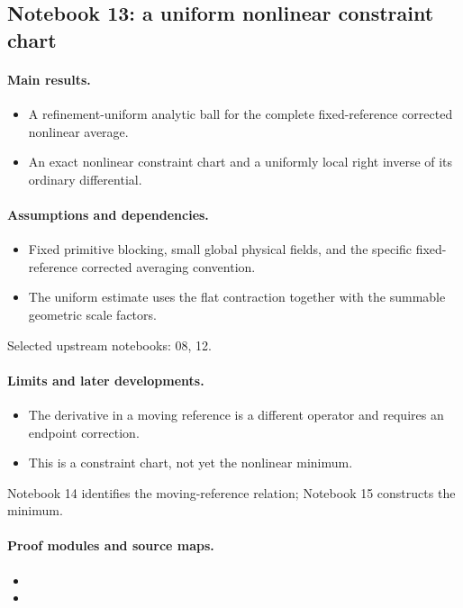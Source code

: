 \subsection{Notebook 13: a uniform nonlinear constraint chart}
\label{hnc-13}
\noindent{}\par

\paragraph{Main results.}
\begin{itemize}
\item A refinement-uniform analytic ball for the complete fixed-reference corrected nonlinear average.
\item An exact nonlinear constraint chart and a uniformly local right inverse of its ordinary differential.
\end{itemize}

\paragraph{Assumptions and dependencies.}
\begin{itemize}
\item Fixed primitive blocking, small global physical fields, and the specific fixed-reference corrected averaging convention.
\item The uniform estimate uses the flat contraction together with the summable geometric scale factors.
\end{itemize}

Selected upstream notebooks: 08, 12.\par

\paragraph{Limits and later developments.}
\begin{itemize}
\item The derivative in a moving reference is a different operator and requires an endpoint correction.
\item This is a constraint chart, not yet the nonlinear minimum.
\end{itemize}

Notebook 14 identifies the moving-reference relation; Notebook 15 constructs the minimum.

\paragraph{Proof modules and source maps.}
\begingroup\small
\begin{itemize}
\item {}
\item {}
\end{itemize}
\endgroup


